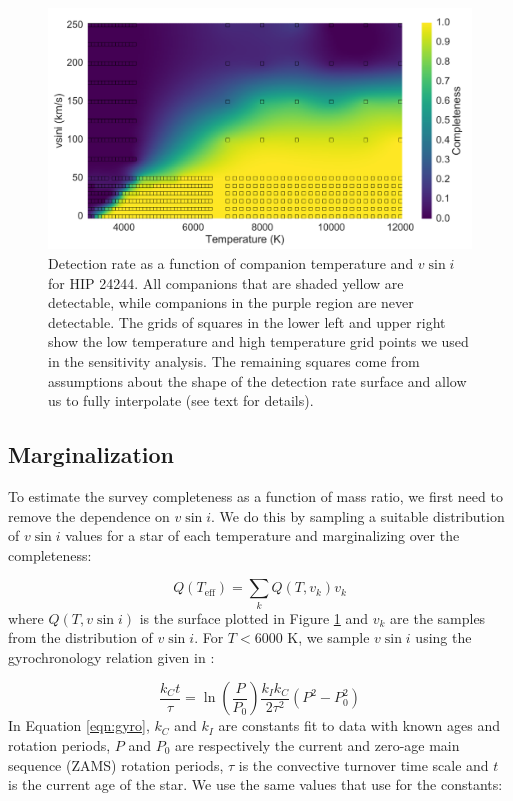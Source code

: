 \documentclass{emulateapj}
\begin{document}
\begin{figure}
\includegraphics[width=\columnwidth]{HIP_24244_20130919.pdf}
\caption{Detection rate as a function of companion temperature and $v\sin{i}$ for HIP 24244. All companions that are shaded yellow are detectable, while companions in the purple region are never detectable. The grids of squares in the lower left and upper right show the low temperature and high temperature grid points we used in the sensitivity analysis. The remaining squares come from assumptions about the shape of the detection rate surface and allow us to fully interpolate (see text for details).}
\label{fig:detrate_2d}
\end{figure}

\subsection{Marginalization}
To estimate the survey completeness as a function of mass ratio, we first need to remove the dependence on $v\sin{i}$. We do this by sampling a suitable distribution of $v\sin{i}$ values for a star of each temperature and marginalizing over the completeness:

\begin{equation}
Q(T_\mathrm{eff}) = \sum_k Q(T, v_k) v_k 
\end{equation} 
where $Q(T, v\sin{i})$ is the surface plotted in Figure \ref{fig:detrate_2d} and $v_k$ are the samples from the distribution of $v\sin{i}$. For $T < 6000$ K, we sample $v\sin{i}$ using the gyrochronology relation given in \citet{Barnes2010b}:

\begin{equation}
\frac{k_Ct}{\tau} = \ln\left ( \frac{P}{P_0} \right ) \frac{k_Ik_C}{2\tau^2} (P^2 - P_0^2)
\label{eqn:gyro}
\end{equation}
In Equation \ref{eqn:gyro}, $k_C$ and $k_I$ are constants fit to data with known ages and rotation periods, $P$ and $P_0$ are respectively the current and zero-age main sequence (ZAMS) rotation periods, $\tau$ is the convective turnover time scale and $t$ is the current age of the star. We use the same values that \cite{Barnes2010b} use for the constants:
\end{document}
